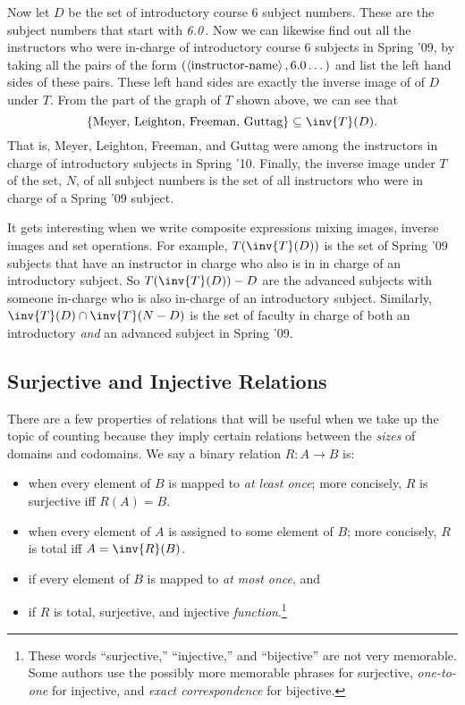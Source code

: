 Now let $D$ be the set of introductory course 6 subject numbers.
These are the subject numbers that start with \emph{6.0}\,.  Now we
can likewise find out all the instructors who were in-charge of
introductory course 6 subjects in Spring '09, by taking all the pairs
of the form $(\left\langle\text{instructor-name}\right\rangle, 6.0\dots)$ and list the
left hand sides of these pairs.  These left hand sides are exactly the
inverse image of of $D$ under $T$.  From the part of the
graph of $T$ shown above, we can see that
\[
\set{\text{Meyer, Leighton, Freeman, Guttag}} \subseteq \inv{T}(D).
\]
That is, Meyer, Leighton, Freeman, and Guttag were among the
instructors in charge of introductory subjects in Spring '10.
Finally, the inverse image under $T$ of the set, $N$, of all subject
numbers is the set of all instructors who were in charge of a Spring
'09 subject.

It gets interesting when we write composite expressions mixing images,
inverse images and set operations.  For example, $T(\inv{T}(D))$ is
the set of Spring '09 subjects that have an instructor in charge who
also is in in charge of an introductory subject.  So $T(\inv{T}(D)) -
D$ are the advanced subjects with someone in-charge who is also
in-charge of an introductory subject.  Similarly, $\inv{T}(D) \intersect
\inv{T}(N-D)$ is the set of faculty in charge of both an introductory \emph{and}
an advanced subject in Spring '09.

\subsection{Surjective and Injective Relations}\label{surj_sec}

There are a few properties of relations that will be useful when we take
up the topic of counting because they imply certain relations between the
\emph{sizes} of domains and codomains.  We say a binary relation $R : A
\to B$ is:

\begin{itemize}

\item {} when every element of $B$ is mapped to \textit{at
least once}; more concisely, $R$ is surjective iff $R(A)=B$.

\item {} when every element of $A$ is assigned to some element of
  $B$; more concisely, $R$ is total iff $A=\inv{R}(B)$.

\item {} if every element of $B$ is mapped to \textit{at
most once}, and

\item {} if $R$ is total, surjective, and injective
  \emph{function}.\footnote{These words ``surjective,''
``injective,'' and ``bijective'' are not very memorable.
Some authors use the possibly more memorable phrases  for surjective,
\emph{one-to-one} for injective, and \emph{exact correspondence} for bijective.}

\end{itemize}

